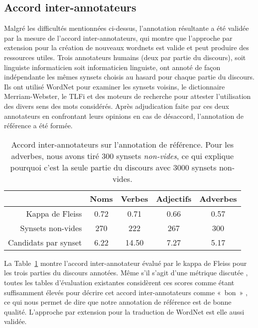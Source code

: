 \subsection{Accord inter-annotateurs}
\label{subsec:interannotator_agreement}

Malgré les difficultés mentionnées ci-dessus, l'annotation résultante a été
validée par la mesure de l'accord inter-annotateurs, qui montre que l'approche
par extension pour la création de nouveaux wordnets est valide et peut produire
des ressources utiles. Trois annotateurs humains (deux par partie du discours),
soit linguiste informaticien soit informaticien linguiste, ont annoté de façon
indépendante les mêmes synsets choisis au hasard pour chaque partie du
discours. Ils ont utilisé WordNet pour examiner les synsets voisins, le
dictionnaire Merriam-Webster, le TLFi \citep{TLFi} et des moteurs de recherche
pour attester l'utilisation des divers sens des mots considérés. Après
adjudication faite par ces deux annotateurs en confrontant leurs opinions en
cas de désaccord, l'annotation de référence a été formée.

\begin{table}[ht]
\centering
\begin{tabular}{rcccc}
  \toprule
                        & Noms    & Verbes  & Adjectifs & Adverbes\\
  \midrule
  Kappa de Fleiss       & 0.72    & 0.71    & 0.66      & 0.57 \\
  Synsets non-vides     & 270     & 222     & 267       & 300  \\
  Candidats par synset  & 6.22    & 14.50   & 7.27      & 5.17 \\
  \bottomrule
\end{tabular}
\caption{\label{table:kappa}Accord inter-annotateurs sur l'annotation de
    référence. Pour les adverbes, nous avons tiré 300 synsets
\textit{non-vides}, ce qui explique pourquoi c'est la seule partie du discours
avec 3000 synsets non-vides.}
\end{table}

La Table~\ref{table:kappa} montre l'accord inter-annotateur évalué par le kappa
de Fleiss pour les trois parties du discours annotées. Même s'il s'agit d'une
métrique discutée \citep{powers2012problem}, toutes les tables d'évaluation
existantes considèrent ces scores comme étant suffisamment élevés pour décrire
cet accord inter-annotateurs comme «~bon~» \citep{gwet2001handbook}, ce qui
nous permet de dire que notre annotation de référence est de bonne qualité.
L'approche par extension pour la traduction de WordNet est elle aussi validée.

